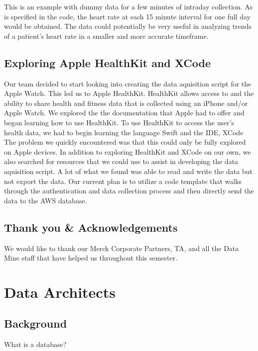 \documentclass[]{book}
\begin{document}
This is an example with dummy data for a few minutes of intraday
collection. As is specified in the code, the heart rate at each 15
minute interval for one full day would be obtained. The data could
potentially be very useful in analyzing trends of a patient's heart rate
in a smaller and more accurate timeframe.

\section{Exploring Apple HealthKit and
XCode}\label{exploring-apple-healthkit-and-xcode}

Our team decided to start looking into creating the data aquisition
script for the Apple Watch. This led us to Apple HealthKit. HealthKit
allows access to and the ability to share health and fitness data that
is collected using an iPhone and/or Apple Watch. We explored the the
documentation that Apple had to offer and began learning how to use
HealthKit. To use HealthKit to access the user's health data, we had to
begin learning the language Swift and the IDE, XCode The problem we
quickly encountered was that this could only be fully explored on Apple
devices. In addition to exploring HealthKit and XCode on our own, we
also searched for resources that we could use to assist in developing
the data aquisition script. A lot of what we found was able to read and
write the data but not export the data. Our current plan is to utilize a
code template that walks through the authentication and data collection
process and then directly send the data to the AWS database.

\section{Thank you \&
Acknowledgements}\label{thank-you-acknowledgements}

We would like to thank our Merck Corporate Partners, TA, and all the
Data Mine staff that have helped us throughout this semester.

\chapter{Data Architects}\label{data-architects}

\section{Background}\label{background}

What is a database?
\end{document}
